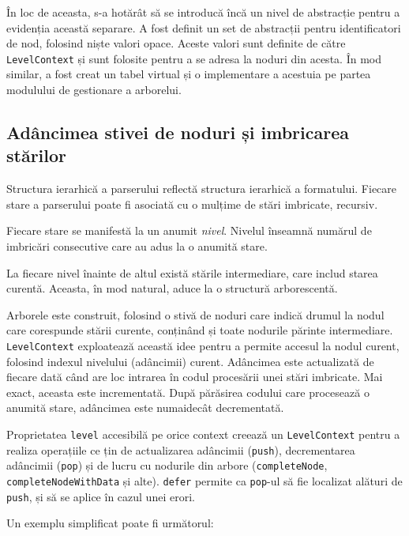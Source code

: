 \documentclass[a4paper,12pt]{report}
\begin{document}
În loc de aceasta, s-a hotărât să se introducă încă un nivel de abstracție pentru a evidenția această separare.
A fost definit un set de abstracții pentru identificatori de nod,
folosind niște valori opace.
Aceste valori sunt definite de către \texttt{LevelContext} și sunt folosite pentru a se adresa la noduri din acesta.
În mod similar, a fost creat un tabel virtual și o implementare a acestuia pe partea modulului de gestionare a arborelui.

\subsection{Adâncimea stivei de noduri și imbricarea stărilor}

Structura ierarhică a parserului reflectă structura ierarhică a formatului.
Fiecare stare a parserului poate fi asociată cu o mulțime de stări imbricate, recursiv.

Fiecare stare se manifestă la un anumit \textit{nivel}. 
Nivelul înseamnă numărul de imbricări consecutive care au adus la o anumită stare.

La fiecare nivel înainte de altul există stările intermediare, care includ starea curentă.
Aceasta, în mod natural, aduce la o structură arborescentă.

Arborele este construit, folosind o stivă de noduri care
indică drumul la nodul care corespunde stării curente,
conținând și toate nodurile părinte intermediare.
\texttt{LevelContext} exploatează această idee pentru a permite accesul la
nodul curent, folosind indexul nivelului (adâncimii) curent.
Adâncimea este actualizată de fiecare dată când are loc intrarea în codul procesării unei stări imbricate.
Mai exact, aceasta este incrementată.
După părăsirea codului care procesează o anumită stare, adâncimea este numaidecât decrementată.

Proprietatea \texttt{level} accesibilă pe orice context creează un \texttt{LevelContext}
pentru a realiza operațiile ce țin de actualizarea adâncimii (\texttt{push}),
decrementarea adâncimii (\texttt{pop}) și de lucru cu nodurile
din arbore (\texttt{completeNode}, \texttt{completeNodeWithData} și alte).
\texttt{defer} permite ca \texttt{pop}-ul să fie localizat alături de \texttt{push},
și să se aplice în cazul unei erori. 

Un exemplu simplificat poate fi următorul:
\end{document}
